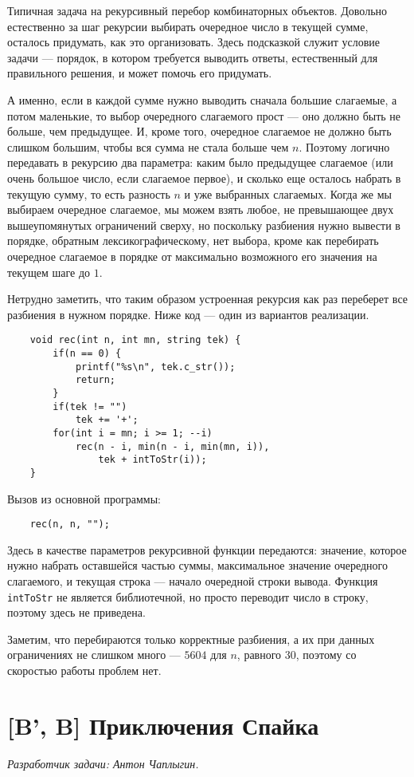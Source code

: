 \documentclass[12pt]{article}
\theoremstyle{definition}
\begin{document}
Типичная задача на рекурсивный перебор комбинаторных объектов. Довольно естественно за шаг рекурсии выбирать очередное число
в текущей сумме, осталось придумать, как это организовать. Здесь подсказкой служит условие задачи --- порядок, в котором
требуется выводить ответы, естественный для правильного решения, и может помочь его придумать.

А именно, если в каждой сумме нужно выводить
сначала большие слагаемые, а потом маленькие, то
выбор очередного слагаемого прост --- оно должно быть не больше, чем предыдущее.
И, кроме того, очередное слагаемое не должно быть слишком
большим, чтобы вся сумма не стала больше чем $n$. Поэтому
логично передавать в рекурсию два параметра: каким было предыдущее слагаемое (или очень большое число, если слагаемое первое), и сколько еще осталось набрать в текущую сумму, то есть 
разность $n$ и уже выбранных слагаемых.
Когда же мы выбираем очередное слагаемое, мы можем взять любое,
не превышающее двух вышеупомянутых ограничений сверху, но
поскольку разбиения нужно вывести в порядке, обратным лексикографическому, нет выбора, кроме как перебирать очередное слагаемое в порядке от максимально возможного его значения
на текущем шаге до $1$.

Нетрудно заметить, что таким образом устроенная рекурсия как
раз переберет все разбиения в нужном порядке. Ниже код ---
один из вариантов реализации.
\begin{lstlisting}
    void rec(int n, int mn, string tek) {
        if(n == 0) {
            printf("%s\n", tek.c_str());
            return;
        }
        if(tek != "")
            tek += '+';
        for(int i = mn; i >= 1; --i)
            rec(n - i, min(n - i, min(mn, i)),
                tek + intToStr(i));
    }
\end{lstlisting}
Вызов из основной программы:
\begin{lstlisting}
    rec(n, n, "");
\end{lstlisting}
Здесь в качестве параметров рекурсивной функции передаются:
значение, которое нужно набрать оставшейся частью суммы,
максимальное значение очередного слагаемого, и текущая строка ---
начало очередной строки вывода. Функция \verb|intToStr|
не является библиотечной, но просто переводит число в строку, поэтому здесь не приведена.

Заметим, что перебираются только корректные разбиения,
а их при данных ограничениях не слишком много ---
$5604$ для $n$, равного $30$, поэтому со скоростью работы проблем нет.

\section{[B', B] Приключения Спайка}
\textit{Разработчик задачи: Антон Чаплыгин.}
\end{document}
